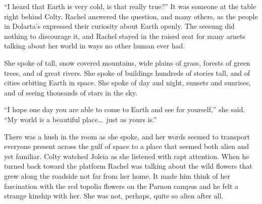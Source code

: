 ``I heard that Earth is very cold, is that really true?'' It was someone at the table right
behind Colty. Rachel answered the question, and many others, as the people in Dolarta's
expressed their curiosity about Earth openly. The seesung did nothing to discourage it, and
Rachel stayed in the raised seat for many arnets talking about her world in ways no other human
ever had.

She spoke of tall, snow covered mountains, wide plains of grass, forests of green trees, and of
great rivers. She spoke of buildings hundreds of stories tall, and of cities orbiting Earth in
space. She spoke of day and night, sunsets and sunrises, and of seeing thousands of stars in the
sky.

``I hope one day you are able to come to Earth and see for yourself,'' she said. ``My world is a
beautiful place\ldots\ just as yours is.''


There was a hush in the room as she spoke, and her words seemed to transport everyone present
across the gulf of space to a place that seemed both alien and yet familiar. Colty watched
Joleia as she listened with rapt attention. When he turned back toward the platform Rachel was
talking about the wild flowers that grew along the roadside not far from her home. It made him
think of her fascination with the red topolia flowers on the Parnon campus and he felt a strange
kinship with her. She was not, perhaps, quite so alien after all.


